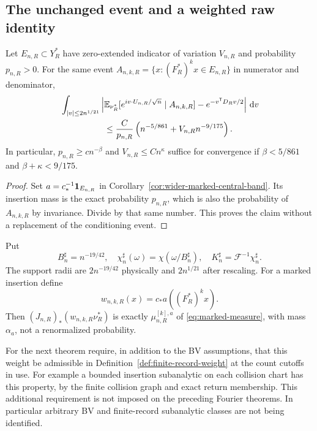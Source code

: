 \subsection{The unchanged event and a weighted raw identity}
\begin{corollary}
\label{cor:wider-same-event-band}
Let $E_{n,R}\subset Y_R^*$ have zero-extended indicator of variation
$V_{n,R}$ and probability $p_{n,R}>0$. For the same event
$A_{n,k,R}=\{x:(F_R^*)^kx\in E_{n,R}\}$ in numerator and denominator,
\begin{align}
 &\int_{|v|\le2n^{1/21}}
 \left|\mathbb E_{\nu_R^*}
       [e^{iv\cdot U_{n,R}/\sqrt n}\mid A_{n,k,R}]
                         -e^{-v^{\mathsf T}D_Rv/2}\right|\dd v\notag\\
 &\hspace{18mm}\le\frac C{p_{n,R}}
                    \left(n^{-5/861}+V_{n,R}n^{-9/175}\right).
 \label{eq:wider-same-event-band}
\end{align}
In particular, $p_{n,R}\ge cn^{-\beta}$ and
$V_{n,R}\le Cn^\kappa$ suffice for convergence if
$\beta<5/861$ and $\beta+\kappa<9/175$.
\end{corollary}
\begin{proof}
Set $a=c_*^{-1}\mathbf1_{E_{n,R}}$ in
Corollary~\ref{cor:wider-marked-central-band}. Its insertion mass is
the exact probability $p_{n,R}$, which is also the probability of
$A_{n,k,R}$ by invariance. Divide by that same number. This proves
the claim without a replacement of the conditioning event.
\end{proof}

Put
\begin{equation}\label{eq:sharp-inversion-cutoff}
 B_n^\sharp=n^{-19/42},\quad
 \chi_n^\sharp(\omega)=\chi(\omega/B_n^\sharp),\quad
 K_n^\sharp=\mathcal F^{-1}\chi_n^\sharp.
\end{equation}
The support radii are $2n^{-19/42}$ physically and $2n^{1/21}$
after rescaling. For a marked insertion define
\[
 w_{n,k,R}(x)=c_*a((F_R^*)^kx).
\]
Then $(J_{n,R})_*(w_{n,k,R}\nu_R^*)$ is exactly
$\mu_{n,R}^{[k],a}$ of \eqref{eq:marked-measure}, with mass
$\alpha_a$, not a renormalized probability.

For the next theorem require, in addition to the BV assumptions,
that this weight be admissible in
Definition~\ref{def:finite-record-weight} at the count cutoffs in use.
For example a bounded insertion subanalytic on each collision chart
has this property, by the finite collision graph and exact return
membership. This additional requirement is not imposed on the preceding
Fourier theorems. In particular arbitrary BV and finite-record
subanalytic classes are not being identified.

